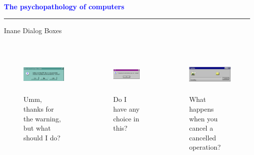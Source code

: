 \documentclass[pdf]{beamer}
\begin{document}
\begin{frame}
    \textcolor{Blue}{\textbf{\Large{The psychopathology of computers}}}
    \textcolor{red}{\rule{10cm}{1mm}}
    
{\LARGE{{Inane Dialog Boxes}}}

\vspace{-5mm}


\begin{columns}[t]
\centering
\begin{figure}[H]
	\begin{flushleft}
	\includegraphics[width=5.2cm,height=2cm]{32_SourceSafe.png}\\
	Umm, thanks for the warning, but what should I do?
    \end{flushleft}
\end{figure}
\begin{figure}[H]
	\begin{flushleft}
	\includegraphics[width=5.7cm,height=2cm]{32_AXE.png}
    \\ Do I have any choice in this?
    \end{flushleft}
\end{figure}
\centering
\begin{figure}[H]
	\begin{flushleft}
	\includegraphics[width=5.3cm,height=2cm]{32_Saving.png}\\
	What happens when you cancel a cancelled operation?
    \end{flushleft}

\end{figure}
\end{columns}
\end{frame}
\end{document}
